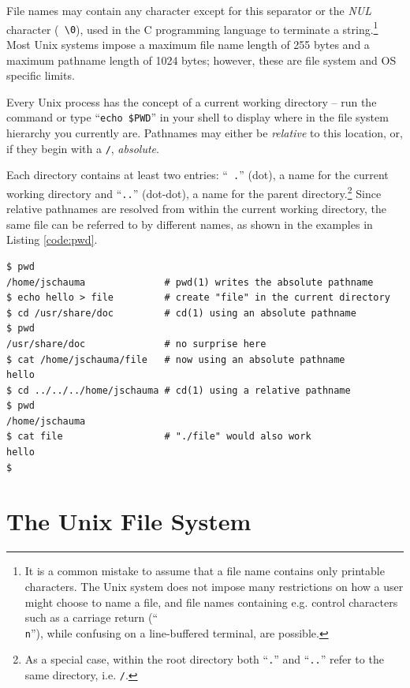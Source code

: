File names may contain any character except for this
separator or the {\em NUL} character ({\tt
\textbackslash0}), used in the C programming
language to terminate a string.\footnote{It is a
common mistake to assume that a file name contains
only printable characters.  The Unix system does not
impose many restrictions on how a user might choose
to name a file, and file names containing e.g. control
characters such as a carriage return (``{\tt \\n}''),
while confusing on a line-buffered terminal, are
possible.}  Most Unix systems impose a maximum file
name length of 255 bytes and a maximum pathname length
of 1024 bytes; however, these are file system and OS
specific limits.

Every Unix process has the concept of a current
working directory -- run the  command
or type ``{\tt echo \$PWD}'' in your shell to display
where in the file system hierarchy you currently are.
Pathnames may either be {\em relative} to this
location, or, if they begin with a {\tt /}, {\em
absolute}.

Each directory contains at least two entries: ``{\tt
.}'' (dot), a name for the current working directory
and ``{\tt ..}'' (dot-dot), a name for the parent
directory.\footnote{As a special case, within the root
directory both ``{\tt .}'' and ``{\tt ..}'' refer to
the same directory, i.e. {\tt /}.}  Since relative
pathnames are resolved from within the current working
directory, the same file can be referred to by
different names, as shown in the examples in Listing
\ref{code:pwd}.

\begin{lstlisting}[float,basicstyle=\scriptsize,label=code:pwd,caption={[Absolute
and relative pathnames] Absolute pathnames begin with
a {\tt /} and are resolved from the root of the file
system; relative pathnames are resolved from the
current working directory.}]
$ pwd
/home/jschauma              # pwd(1) writes the absolute pathname
$ echo hello > file         # create "file" in the current directory
$ cd /usr/share/doc         # cd(1) using an absolute pathname
$ pwd
/usr/share/doc              # no surprise here
$ cat /home/jschauma/file   # now using an absolute pathname
hello
$ cd ../../../home/jschauma # cd(1) using a relative pathname
$ pwd
/home/jschauma
$ cat file                  # "./file" would also work
hello
$ 
\end{lstlisting}

\section{The Unix File System}
\label{sec:unix-file-system}

